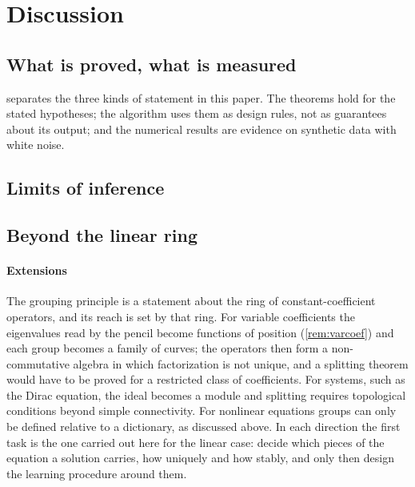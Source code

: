 \section{Discussion}\label{sec:discussion}
\subsection{What is proved, what is measured}
 separates the three kinds of statement in this paper. The theorems hold for the stated hypotheses; the
algorithm uses them as design rules, not as guarantees about its output; and the numerical results are evidence on
synthetic data with white noise.



\subsection{Limits of inference}\label{sec:limits}


\subsection{Beyond the linear ring}\label{sec:beyond}\label{sec:nonlinear}


\paragraph{Extensions}
The grouping principle is a statement about the ring of constant-coefficient operators, and its reach is set by that
ring. For variable coefficients the eigenvalues read by the pencil become functions of position (\cref{rem:varcoef}) and
each group becomes a family of curves; the operators then form a non-commutative algebra in which factorization is not
unique, and a splitting theorem would have to be proved for a restricted class of coefficients. For systems, such as the
Dirac equation, the ideal becomes a module and splitting requires topological conditions beyond simple connectivity. For
nonlinear equations groups can only be defined relative to a dictionary, as discussed above. In each direction the
first task is the one carried out here for the linear case: decide which pieces of the equation a solution carries, how
uniquely and how stably, and only then design the learning procedure around them.

